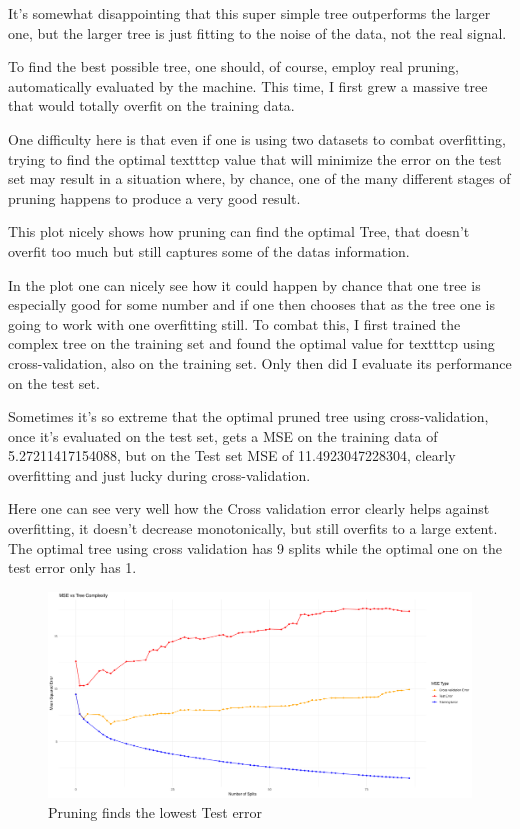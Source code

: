 \documentclass[12pt]{article}
\begin{document}
It's somewhat disappointing that this super simple tree outperforms the larger one, but the larger tree is just fitting to the noise of the data, not the real signal.

To find the best possible tree, one should, of course, employ real pruning, automatically evaluated by the machine. This time, I first grew a massive tree that would totally overfit on the training data.

One difficulty here is that even if one is using two datasets to combat overfitting, trying to find the optimal texttt{cp} value that will minimize the error on the test set may result in a situation where, by chance, one of the many different stages of pruning happens to produce a very good result.

This plot nicely shows how pruning can find the optimal Tree, that doesn't overfit too much but still captures some of the datas information.

In the  plot one can nicely see how it could happen by chance that one tree is especially good for some number and if one then chooses that as the tree one is going to work with one overfitting still.
To combat this, I first trained the complex tree on the training set and found the optimal value for texttt{cp} using cross-validation, also on the training set. Only then did I evaluate its performance on the test set.

Sometimes it's so extreme that the optimal pruned tree using cross-validation, once it's evaluated on the test set, gets a MSE on the training data of 5.27211417154088, but on the Test set MSE of 11.4923047228304, clearly overfitting and just lucky during cross-validation.

Here one can see very well how the Cross validation error clearly helps against overfitting, it doesn't decrease monotonically, but still overfits to a large extent. The optimal tree using cross validation has 9 splits while the optimal one on the test error only has 1.

\begin{figure}
    \centering
    \includegraphics[scale=0.30]{triple_pruning_plot.pdf}
    \caption{Pruning finds the lowest Test error}
\end{figure}
\end{document}
